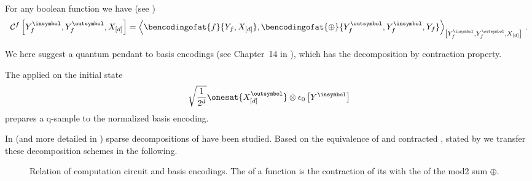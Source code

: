 \begin{lemma}
    \label{lem:bencComCircuit}
    For any boolean function we have (see )
    \begin{align*}
        \qcbencodingofat{\exformula}{\cheadvariableof{\exformula}{\insymbol},\cheadvariableof{\exformula}{\outsymbol},\shortcatvariables}
        = \contractionof{
            \bencodingofat{\exformula}{\headvariableof{\exformula},\shortcatvariables},
            \bencodingofat{\oplus}{\cheadvariableof{\exformula}{\outsymbol},\cheadvariableof{\exformula}{\insymbol},\headvariableof{\exformula}}
        }{\cheadvariableof{\exformula}{\insymbol},\cheadvariableof{\exformula}{\outsymbol},\shortcatvariables} \, .
    \end{align*}
\end{lemma}

We here suggest a quantum pendant to basis encodings (see Chapter~14 in \cite{goessmann_tensor-network_2025}), which has the decomposition by contraction property.


The \computationCircuit{} applied on the initial state
\begin{align*}
    \sqrt{\frac{1}{2^{\catorder}}} \onesat{\ccatvariableof{[\atomorder]}{\outsymbol}} \otimes \fbasisat{\cheadvariable{\insymbol}}
\end{align*}
prepares a q-sample to the normalized basis encoding. %


In \cite{goessmann_tensor_2026} (and more detailed in \cite{goessmann_tensor-network_2025}) sparse decompositions of \basisEncodings{} have been studied.
Based on the equivalence of \computationCircuits{} and contracted \basisEncodings{}, stated by  we transfer these decomposition schemes in the following.

\begin{figure}[t]
    \begin{center}
        
    \end{center}
    \caption{Relation of computation circuit and basis encodings.
    The \computationCircuit{} of a function is the contraction of its \basisEncoding{} with the \basisEncoding{} of the mod2 sum $\oplus$.}
    \label{fig:bencComCircuit}
\end{figure}





